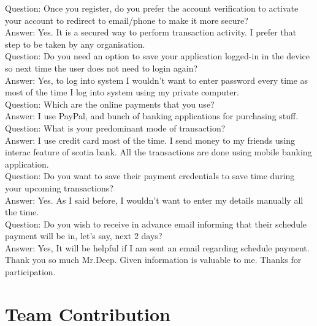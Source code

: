 \documentclass[11pt, english]{report}
\begin{document}
Question: Once you register, do you prefer the account verification to activate your account to redirect to email/phone to make it more secure?\\
Answer: Yes. It is a secured way to perform transaction activity. I prefer that step to be taken by any organisation.\\
 
Question: Do you need an option to save your application logged-in in the device so next time the user does not need to login again?\\
Answer: Yes, to log into system I wouldn't want to enter password every time as most of the time I log into system using my private computer. \\

Question: Which are the online payments that you use?\\
Answer: I use PayPal, and bunch of banking applications for purchasing stuff.\\
 
Question: What is your predominant mode of transaction?\\
Answer: I use credit card most of the time. I send money to my friends using interac feature of scotia bank. All the transactions are done using mobile banking application.\\
 
Question: Do you want to save their payment credentials to save time during your upcoming transactions?\\
Answer: Yes. As I said before, I wouldn't want to enter my details manually all the time.\\
 
Question: Do you wish to receive in advance email informing that their schedule payment will be in, let’s say, next 2 days?\\
Answer: Yes, It will be helpful if I am sent an email regarding schedule payment.\\

Thank you so much Mr.Deep. Given information is valuable to me. Thanks for participation. \\


\newpage
\chapter{Team Contribution}
\end{document}
